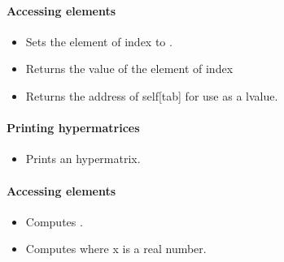 \paragraph{Accessing elements}

\begin{itemize}
\item   {}
  \sshortdescribe Sets the element of index  to .
  
\item {}
  \sshortdescribe Returns the value of the element of index  
  
\item {}
  \sshortdescribe Returns the address of self[tab] for use as a lvalue.  
\end{itemize}  

\paragraph{Printing hypermatrices}

\begin{itemize}
\item {}
  \sshortdescribe Prints an hypermatrix.
\end{itemize}

\paragraph{Accessing elements}

\begin{itemize}
\item {}
  \sshortdescribe Computes .
  
\item {}
  \sshortdescribe Computes  where x is a real number.
\end{itemize}


